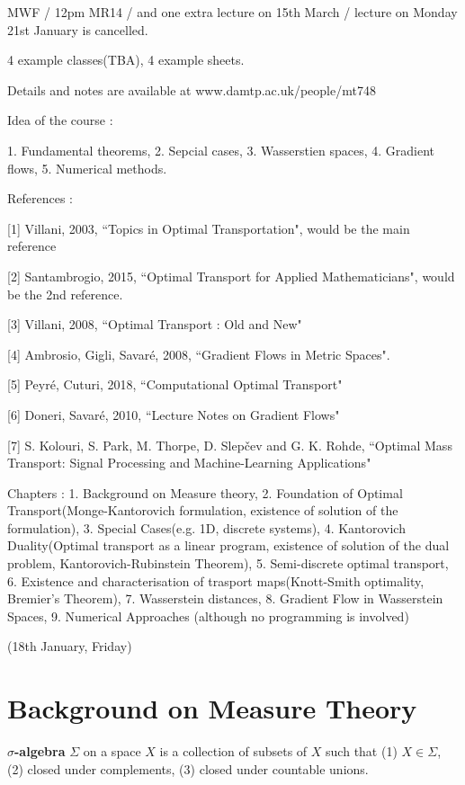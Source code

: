 \documentclass[12pt,a4paper]{article}
\begin{document}
MWF / 12pm MR14 / and one extra lecture on 15th March / lecture on Monday 21st January is cancelled.

4 example classes(TBA), 4 example sheets.

Details and notes are available at www.damtp.ac.uk/people/mt748
\s

Idea of the course :

1. Fundamental theorems, 2. Sepcial cases, 3. Wasserstien spaces, 4. Gradient flows, 5. Numerical methods.
\s

References :

[1] Villani, 2003, ``Topics in Optimal Transportation", would be the main reference

[2] Santambrogio, 2015, ``Optimal Transport for Applied Mathematicians", would be the 2nd reference.

[3] Villani, 2008, ``Optimal Transport : Old and New"

[4] Ambrosio, Gigli, Savar\'{e}, 2008, ``Gradient Flows in Metric Spaces".

[5] Peyr\'{e}, Cuturi, 2018, ``Computational Optimal Transport"

[6] Doneri, Savar\'{e}, 2010, ``Lecture Notes on Gradient Flows"

[7] S. Kolouri, S. Park, M. Thorpe, D. Slepčev and G. K. Rohde, ``Optimal Mass Transport: Signal Processing and Machine-Learning Applications"
\s

Chapters : 1. Background on Measure theory, 2. Foundation of Optimal Transport(Monge-Kantorovich formulation, existence of solution of the formulation), 3. Special Cases(e.g. 1D, discrete systems), 4. Kantorovich Duality(Optimal transport as a linear program, existence of solution of the dual problem, Kantorovich-Rubinstein Theorem), 5. Semi-discrete optimal transport, 6. Existence and characterisation of trasport maps(Knott-Smith optimality, Bremier's Theorem), 7. Wasserstein distances, 8. Gradient Flow in Wasserstein Spaces, 9. Numerical Approaches (although no programming is involved)

\newday

(18th January, Friday)

\section{Background on Measure Theory}

 \textbf{$\sigma$-algebra} $\Sigma$ on a space $X$ is a collection of subsets of $X$ such that (1) $X\in \Sigma$, (2) closed under complements, (3) closed under countable unions.
\end{document}
